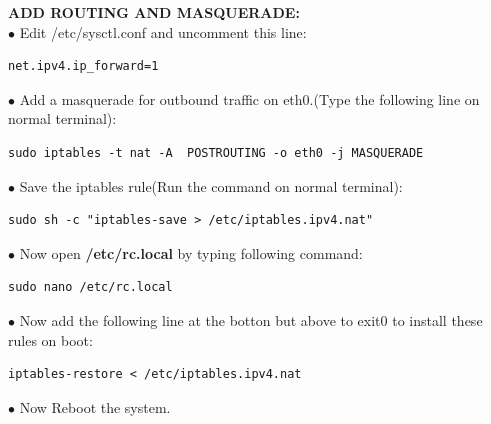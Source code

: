 \documentclass[journal,12pt,onecolumn]{IEEEtran}
\begin{document}
\begin{flushleft}
\textbf{ADD ROUTING AND MASQUERADE:} \\
\bigskip
$\bullet$ Edit /etc/sysctl.conf and uncomment this line: \\
\bigskip
\begin{lstlisting}[frame=single,linewidth=7cm,breaklines=true]
net.ipv4.ip_forward=1
\end{lstlisting}
\bigskip
$\bullet$  Add a masquerade for outbound traffic on eth0.(Type the following line on normal terminal):\\
\begin{lstlisting}[frame=single,linewidth=15cm,breaklines=true]
sudo iptables -t nat -A  POSTROUTING -o eth0 -j MASQUERADE
\end{lstlisting}
\bigskip
$\bullet$ Save the iptables rule(Run the command on normal terminal): \\
\bigskip
\begin{lstlisting}[frame=single,linewidth=15cm,breaklines=true]
sudo sh -c "iptables-save > /etc/iptables.ipv4.nat"
\end{lstlisting}
\bigskip

$\bullet$ Now open \textbf{/etc/rc.local} by typing following command:\\
\bigskip
\begin{lstlisting}[frame=single,linewidth=7cm,breaklines=true]
sudo nano /etc/rc.local
\end{lstlisting}
\bigskip
$\bullet$ Now add the following line at the botton but above to exit0 to install these rules on boot:\\
\bigskip
\begin{lstlisting}[frame=single,linewidth=12cm,breaklines=true]
iptables-restore < /etc/iptables.ipv4.nat
\end{lstlisting}
\bigskip

$\bullet$ Now Reboot the  system.


\end{flushleft}
\end{document}
